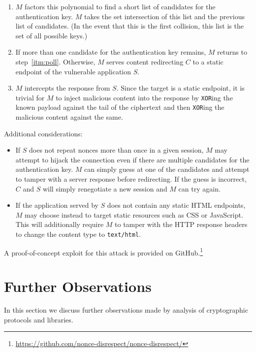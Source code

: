 \begin{enumerate}
\item $M$ factors this polynomial to find a short list of candidates for the authentication key. $M$ takes the set intersection of this list and the previous list of candidates. (In the event that this is the first collision, this list is the set of all possible keys.)

\item If more than one candidate for the authentication key remains, $M$ returns to step~\ref{itm:poll}. Otherwise, $M$ serves content redirecting $C$ to a static endpoint of the vulnerable application $S$.

\item $M$ intercepts the response from $S$. Since the target is a static endpoint, it is trivial for $M$ to inject malicious content into the response by \texttt{XOR}ing the known payload against the tail of the ciphertext and then \texttt{XOR}ing the malicious content against the same.

\end{enumerate}

Additional considerations:

\begin{itemize}

\item If $S$ does not repeat nonces more than once in a given session, $M$ may attempt to hijack the connection even if there are multiple candidates for the authentication key. $M$ can simply guess at one of the candidates and attempt to tamper with a server response before redirecting. If the guess is incorrect, $C$ and $S$ will simply renegotiate a new session and $M$ can try again.

\item If the application served by $S$ does not contain any static HTML endpoints, $M$ may choose instead to target static resources such as CSS or JavaScript. This will additionally require $M$ to tamper with the HTTP response headers to change the content type to \texttt{text/html}.

\end{itemize}

A proof-of-concept exploit for this attack is provided on GitHub.\footnote{\url{https://github.com/nonce-disrespect/nonce-disrespect/}}

\section{Further Observations}
In this section we discuss further observations made by analysis of cryptographic protocols and libraries.

